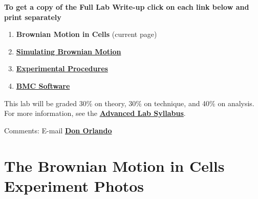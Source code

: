 \documentclass{../lab}
\begin{document}
\textbf{To get a copy of the Full Lab Write-up click on each link below and print separately}

\begin{enumerate}
    \item \textbf{Brownian Motion in Cells} (current page)
    
    \item \href{http://experimentationlab.berkeley.edu/node/83}{\textbf{Simulating Brownian Motion}}
    
    \item \href{http://experimentationlab.berkeley.edu/node/84}{\textbf{Experimental Procedures}}
    
    \item \href{http://experimentationlab.berkeley.edu/node/85}{\textbf{BMC Software}}
\end{enumerate}

This lab will be graded 30\% on theory, 30\% on technique, and 40\% on analysis. For more information, see the \href{\AdvancedLabSyllabus}{\textbf{Advanced Lab Syllabus}}.

Comments: E-mail \href{\MailDonOrlando}{\textbf{Don Orlando}}

\section{The Brownian Motion in Cells Experiment Photos}
\end{document}
